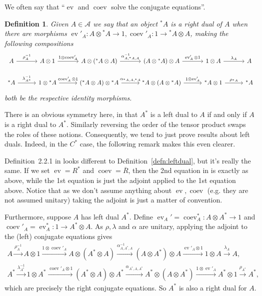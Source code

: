 \documentclass[a4paper,11pt]{article}
\theoremstyle{plain}
\newtheorem{definition}[proposition]{Definition}
\theoremstyle{remark}
\newenvironment{remark}
  {\pushQED{\qed}\renewcommand{\qedsymbol}{$\triangle$}\remarkx}
  {\popQED\endremarkx}
\newcommand{\mc}[1]{\mathcal{#1}}
\newcommand{\ev}{\operatorname{ev}}
\newcommand{\coev}{\operatorname{coev}}
\begin{document}
We often say that ``$\ev$ and $\coev$ solve the conjugate equations''.

\begin{definition}\label{defn:rightdual}
Given $A\in\mc A$ we say that an object ${^*}A$ is a \emph{right dual} of $A$ when there are morphisms $\ev'_A \colon A\otimes {^*}A \to 1, \coev'_A \colon 1 \to {^*}A \otimes A$, making the following compositions
\[\begin{tikzcd}[column sep=6.9ex]
  A \ar[r, "\rho_A^{-1}"]
    & A \otimes 1 \ar[r, "1 \otimes \coev'_A"]
    & A\otimes ({^*}A\otimes A) \ar[r, "\alpha^{-1}_{A,{}^*A,A}"]
    & (A\otimes {}^*A)\otimes A \ar[r, "\ev'_A \otimes 1"]
    & 1\otimes A \ar[r, "\lambda_{A}"]
    & A  \\
  {^*}A \ar[r, "\lambda_{A^*}^{-1}"]
    & 1 \otimes {}^*A \ar[r, "\coev'_A\otimes 1"]
    & ({}^*A\otimes A)\otimes {}^*A \ar[r, "\alpha_{{}^*A,A,{}^*A}"]
    & {}^*A\otimes (A\otimes {}^*A) \ar[r, "1\otimes \ev'_A"]
    & {}^*A \otimes 1 \ar[r, "\rho_{{}^*A}"]
    & {^*}A
\end{tikzcd}\]
both be the respective identity morphisms.
\end{definition}

There is an obvious symmetry here, in that $A^*$ is a left dual to $A$ if and only if $A$ is a right dual to $A^*$.  Similarly reversing the order of the tensor product swaps the roles of these notions.  Consequently, we tend to just prove results about left duals.  Indeed, in the $C^*$ case, the following remark makes this even clearer.

\begin{remark}\label{rem:cstar_dual_case}
Definition~2.2.1 in \cite{NT_CQGsBook} looks different to Definition~\ref{defn:leftdual}, but it's really the same.  If we set $\ev = R^*$ and $\coev=\overline R$, then the 2nd equation in \cite{NT_CQGsBook} is exactly as above, while the 1st equation is just the adjoint applied to the 1st equation above.  Notice that as we don't assume anything about $\ev, \coev$ (e.g. they are not assumed unitary) taking the adjoint is just a matter of convention.

Furthermore, suppose $A$ has left dual $A^*$.  Define $\ev_A' = \coev_A^* \colon A\otimes A^* \to 1$ and $\coev'_A = \ev_A^* \colon 1 \to A^*\otimes A$.  As $\rho, \lambda$ and $\alpha$ are unitary, applying the adjoint to the (left) conjugate equations gives
\begin{gather*}
A \xrightarrow{\rho_A^{-1}}
  A\otimes 1 \xrightarrow{1\otimes\coev'_A}
  A\otimes (A^*\otimes A) \xrightarrow{\alpha_{A,A^*,A}^{-1}}
  (A\otimes A^*)\otimes A \xrightarrow{\ev'_A\otimes 1}
  1\otimes A \xrightarrow{\lambda_A} A, \\
A^* \xrightarrow{\lambda_{A^*}^{-1}}
  1\otimes A^* \xrightarrow{\coev'_A\otimes 1}
  (A^*\otimes A)\otimes A^* \xrightarrow{\alpha_{A^*,A,A^*}}
  A^*\otimes (A\otimes A^*) \xrightarrow{1\otimes\ev'_A}
  A^*\otimes 1 \xrightarrow{\rho_{A^*}} A^*,
\end{gather*}
which are precisely the right conjugate equations.  So $A^*$ is also a right dual for $A$.
\end{remark}
\end{document}

